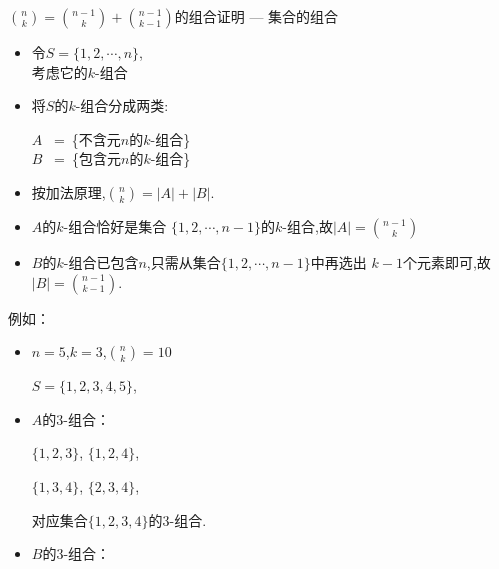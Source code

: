 \documentclass[10pt,punct]{ctexbeamer}
\begin{document}
\begin{frame}{$\binom{n}{k}=\binom{n-1}{k}+\binom{n-1}{k-1}$的组合证明 --- 集合的组合}


    \begin{minipage}{0.49\linewidth}
        \begin{itemize}
            \item 令$S=\{1,2,\cdots,n\}$,\\
            考虑它的$k$-组合

            \item 将$S$的$k$-组合分成两类:
            \begin{center}
                $A$ \, =\, \{不含元$n$的$k$-组合\} \\
                $B$ \, =\, \{包含元$n$的$k$-组合\}
            \end{center}
            \item  按加法原理,$\binom{n}{k}=|A|+|B|$.

            \item $A$的$k$-组合恰好是集合 $\{1,2,\cdots,n-1\}$的$k$-组合,故$|A|=\binom{n-1}{k}$


            \item  $B$的$k$-组合已包含$n$,只需从集合$\{1,2,\cdots,n-1\}$中再选出 $k-1$个元素即可,故$|B|=\binom{n-1}{k-1}.$
        \end{itemize}
    \end{minipage}
    \begin{minipage}{0.49\linewidth}
        \begin{flushleft}
            \quad 例如：

            \begin{itemize}
                \item  $n=5$,$k=3$,$\binom{n}{k}=10$

                $S=\{1,2,3,4,5\}$,




                \item

                \small{$A$的3-组合：

                \begin{center}
                    $\{1,2,3\}$, $\{1,2,4\}$,

                    $\{1,3,4\}$, $\{2,3,4\}$,
                \end{center}

                对应集合$\{1,2,3,4\}$的3-组合.}


                \item  \small{$B$的3-组合：

}
\end{itemize}
\end{flushleft}
\end{minipage}
\end{frame}
\end{document}
